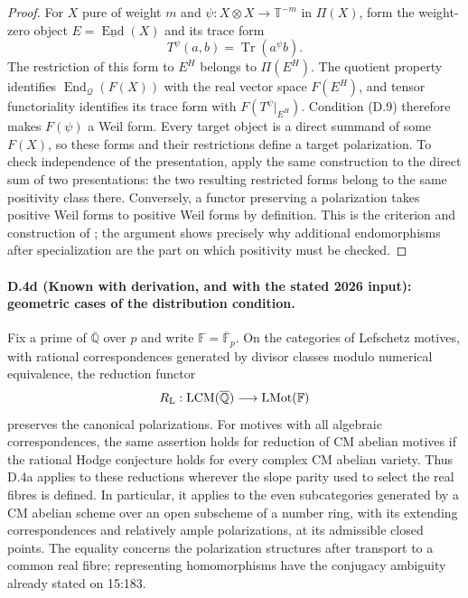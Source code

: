 \begin{proof}
For $X$ pure of weight $m$ and $\psi:X\otimes X\to\mathbb T^{-m}$
in $\Pi(X)$, form the weight-zero object
$E=\underline{\operatorname{End}}(X)$ and its trace form
\[
 T^\psi(a,b)=\operatorname{Tr}(a^\psi b).
\]
The restriction of this form to $E^H$ belongs to $\Pi(E^H)$.
The quotient property identifies
$\operatorname{End}_{\mathcal Q}(F(X))$ with the real vector space
$F(E^H)$, and tensor functoriality identifies its trace form with
$F(T^\psi|_{E^H})$. Condition (D.9) therefore makes $F(\psi)$ a Weil
form. Every target object is a direct summand of some $F(X)$, so these
forms and their restrictions define a target polarization. To check
independence of the presentation, apply the same construction to the
direct sum of two presentations: the two resulting restricted forms
belong to the same positivity class there. Conversely, a functor
preserving a polarization takes positive Weil forms to positive Weil
forms by definition. This is the criterion and construction of
\citet[Lemma 1.2 and Proposition 1.4, pp.~602--603]{D_Milne2002};
the argument shows precisely why additional endomorphisms after
specialization are the part on which positivity must be checked.
\end{proof}

\paragraph{D.4d (Known with derivation, and with the stated 2026 input): geometric cases of the distribution condition.}
Fix a prime of $\overline{\mathbb Q}$ over $p$ and write
$\mathbb F=\overline{\mathbb F}_p$. On the categories of Lefschetz
motives, with rational correspondences generated by divisor classes
modulo numerical equivalence, the reduction functor
\[
 R_{\rm L}:\operatorname{LCM}(\overline{\mathbb Q})
        \longrightarrow\operatorname{LMot}(\mathbb F)
\]
preserves the canonical polarizations. For motives with all algebraic
correspondences, the same assertion holds for reduction of CM abelian
motives if the rational Hodge conjecture holds for every complex CM
abelian variety. Thus D.4a applies to these reductions wherever the
slope parity used to select the real fibres is defined. In particular,
it applies to the even subcategories generated by a CM abelian scheme
over an open subscheme of a number ring, with its extending
correspondences and relatively ample polarizations, at its admissible
closed points. The equality concerns the polarization structures after
transport to a common real fibre; representing homomorphisms have the
conjugacy ambiguity already stated on 15:183.

